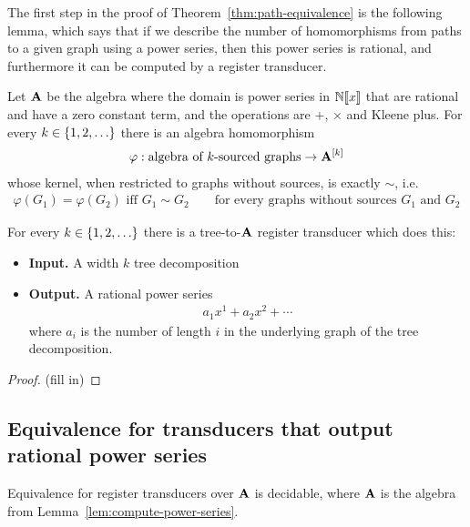 The first step in the proof of Theorem~\ref{thm:path-equivalence} is the following lemma, which says that if we describe the number of homomorphisms from paths to a given graph using a power series, then this power series is rational, and furthermore it can be computed by a register transducer.
\begin{lemma}\label{lem:compute-power-series}    
    Let $\mathbf{A}$ be the algebra where  the domain is power series in $\mathbb N [\![x]\!]$ that are rational and have a zero constant term, and the  operations are  $+$, $\times$ and Kleene plus.
For every $k \in \{1,2,\ldots\}$ there is an algebra homomorphism
\begin{align*}
\varphi : \text{algebra of $k$-sourced graphs} \to \mathbf{A}^{[k]}
\end{align*}
whose kernel, when restricted to graphs without sources, is exactly $\sim$, i.e.
\begin{align*}
\varphi(G_1)=\varphi(G_2) \text{ iff } G_1 \sim G_2 \qquad \text{for every graphs without sources $G_1$ and $G_2$}
\end{align*}

    For every $k \in \{1,2,\ldots\}$ there is a tree-to-$\mathbf{A}$ register transducer which does this:
    \begin{itemize}
        \item {\bf Input.} A width $k$ tree decomposition
        \item {\bf Output.} A rational power series 
        \begin{align*}
        a_1 x^1 + a_2 x^2 + \cdots 
        \end{align*}
        where $a_i$ is the number of length $i$ in the  underlying graph of the tree decomposition. 
    \end{itemize} 
\end{lemma}
\begin{proof}
    (fill in)
\end{proof}

\subsection{Equivalence for transducers that output rational power series}
\label{sec:decide-power-series}
\begin{lemma}
    Equivalence for register transducers over $\mathbf{A}$ is decidable, where $\mathbf{A}$ is the algebra from Lemma~\ref{lem:compute-power-series}. 
\end{lemma}




